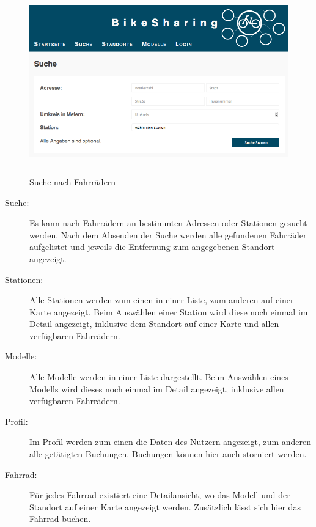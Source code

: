 \begin{figure}[h]
        \centering
	\includegraphics[height=80mm]{pics/bikesharing_search.png}
	\caption{Suche nach Fahrrädern}
\end{figure}

\begin{description}
	\item[Suche:] Es kann nach Fahrrädern an bestimmten Adressen oder Stationen gesucht werden. Nach dem Absenden der Suche werden alle gefundenen Fahrräder aufgelistet und jeweils die Entfernung zum angegebenen Standort angezeigt.
	\item[Stationen:] Alle Stationen werden zum einen in einer Liste, zum anderen auf einer Karte angezeigt. Beim Auswählen einer Station wird diese noch einmal im Detail angezeigt, inklusive dem Standort auf einer Karte und allen verfügbaren Fahrrädern.
	\item[Modelle:] Alle Modelle werden in einer Liste dargestellt. Beim Auswählen eines Modells wird dieses noch einmal im Detail angezeigt, inklusive allen verfügbaren Fahrrädern.
	\item[Profil:] Im Profil werden zum einen die Daten des Nutzern angezeigt, zum anderen alle getätigten Buchungen. Buchungen können hier auch storniert werden.
	\item[Fahrrad:] Für jedes Fahrrad existiert eine Detailansicht, wo das Modell und der Standort auf einer Karte angezeigt werden. Zusätzlich lässt sich hier das Fahrrad buchen.
\end{description}



